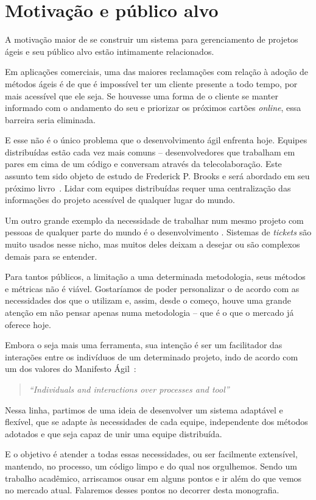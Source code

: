 \section{Motivação e público alvo}

A motivação maior de se construir um sistema para gerenciamento de projetos ágeis e seu público alvo estão intimamente relacionados. 

Em aplicações comerciais, uma das maiores reclamações com relação à adoção de métodos ágeis é de que é impossível ter um cliente presente a todo tempo, por mais acessível que ele seja. Se houvesse uma forma de o cliente se manter informado com o andamento do seu \software{} e priorizar os próximos cartões \textit{online}, essa barreira seria eliminada.

E esse não é o único problema que o desenvolvimento ágil enfrenta hoje. Equipes distribuídas estão cada vez mais comuns -- desenvolvedores que trabalham em pares em cima de um código e conversam através da telecolaboração. Este assunto tem sido objeto de estudo de Frederick P. Brooks e será abordado em seu próximo livro~\cite{brooks}. Lidar com equipes distribuídas requer uma centralização das informações do projeto acessível de qualquer lugar do mundo.

Um outro grande exemplo da necessidade de trabalhar num mesmo projeto com pessoas de qualquer parte do mundo é o desenvolvimento \opensource{}. Sistemas de \textit{tickets} são muito usados nesse nicho, mas muitos deles deixam a desejar ou são complexos demais para se entender.

Para tantos públicos, a limitação a uma determinada metodologia, seus métodos e métricas não é viável. Gostaríamos de poder personalizar o \calopsita{} de acordo com as necessidades dos que o utilizam e, assim, desde o começo, houve uma grande atenção em não pensar apenas numa metodologia -- que é o que o mercado já oferece hoje.

Embora o \calopsita{} seja mais uma ferramenta, sua intenção é ser um facilitador das interações entre os indivíduos de um determinado projeto, indo de acordo com um dos valores do Manifesto Ágil~\cite{manifesto}:

\begin{quote}
\textit{``Individuals and interactions over processes and tool''}
\end{quote}

Nessa linha, partimos de uma ideia de desenvolver um sistema adaptável e flexível, que se adapte às necessidades de cada equipe, independente dos métodos adotados e que seja capaz de unir uma equipe distribuída.

E o objetivo é atender a todas essas necessidades, ou ser facilmente extensível, mantendo, no processo, um código limpo e do qual nos orgulhemos. Sendo um trabalho acadêmico, arriscamos ousar em alguns pontos e ir além do que vemos no mercado atual. Falaremos desses pontos no decorrer desta monografia.
